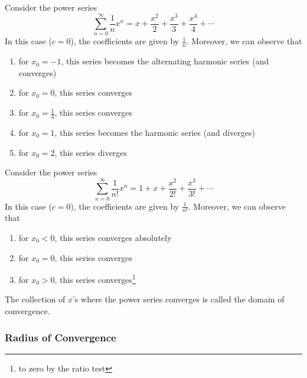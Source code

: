 \begin{exm}\label{exm-power-series:1}
	Consider the power series
	\begin{equation*}
		\sum_{n=0}^\infty \frac{1}{n}x^n = x + \frac{x^2}{2} + \frac{x^3}{3} + \frac{x^4}{4} + \cdots
	\end{equation*}
	In this case ($c=0$), the coefficients are given by $\tfrac{1}{n}$. Moreover,
	we can observe that
	\begin{enumerate}
		\item for $x_0=-1$, this series becomes the alternating harmonic series (and converges)
		\item for $x_0=0$, this series converges
		\item for $x_0=\tfrac{1}{3}$, this series converges
		\item for $x_0=1$, this series becomes the harmonic series (and diverges)
		\item for $x_0=2$, this series diverges
	\end{enumerate}
\end{exm}

\begin{exm}\label{exm-power-series:2}
	Consider the power series
	\begin{equation*}
		\sum_{n=0}^\infty \frac{1}{n!}x^n = 1 + x + \frac{x^2}{2!} + \frac{x^3}{3!}+ \cdots
	\end{equation*}
	In this case ($c=0$), the coefficients are given by $\tfrac{1}{n!}$. Moreover,
	we can observe that
	\begin{enumerate}
		\item for $x_0<0$, this series converges absolutely
		\item for $x_0=0$, this series converges
		\item for $x_0>0$, this series converges\footnote{to zero by the ratio test}
	\end{enumerate}
\end{exm}

\begin{definition}\label{def-domain-of-convergence}
	The collection of $x$'s where the power series converges is called the domain
	of convergence.
\end{definition}

\subsubsection{Radius of Convergence}\label{subsubsec-radius-of-convergence}

